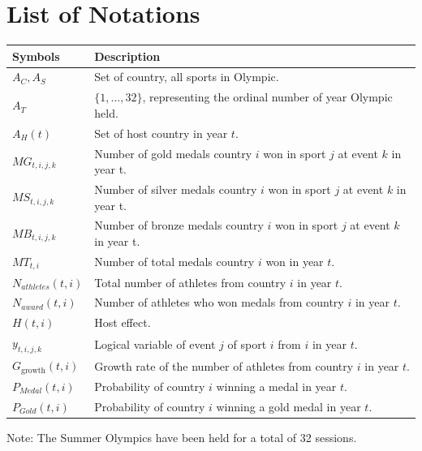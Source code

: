 \documentclass{mcmthesis}
\begin{document}
\section{List of Notations}
\begin{center}
\begin{tabular}{ll}
	\toprule
	{\bf Symbols} & {\bf Description}  \\
	\midrule 
	$A_{C},A_{S}$ & Set of country, all sports in Olympic.\\
	$A_{T}$ & $\{1,\dots,32\}$, representing the ordinal number of year Olympic held. \\
	$A_{H}(t)$ & Set of host country in year $t$. \\
	$MG_{t,i,j,k}$ & Number of gold medals country $i$ won in sport $j$ at event $k$ in year t. \\
	$MS_{t,i,j,k}$ & Number of silver medals country $i$ won in sport $j$ at event $k$ in year t. \\
	$MB_{t,i,j,k}$ & Number of bronze medals country $i$ won in sport $j$ at event $k$ in year t. \\
	$MT_{t,i}$ & Number of total medals country $i$ won in year $t$. \\
	$N_{athletes}(t,i)$ & Total number of athletes from country $i$ in year $t$. \\
	$N_{award}(t,i)$ & Number of athletes who won medals from country $i$ in year $t$. \\
	$H(t,i)$ & Host effect. \\
	$y_{t,i,j,k}$ &  Logical variable of event $j$ of sport $i$ from $i$ in year $t$. \\
	$G_{\text{growth}}(t,i)$ & Growth rate of the number of athletes from country $i$ in year $t$.\\
	$P_{Medal}(t,i)$ & Probability of country $i$ winning a medal in year $t$.\\
	$P_{Gold}(t,i)$ & Probability of country $i$ winning a gold medal in year $t$.\\
	\bottomrule
\end{tabular}
\end{center}

\noindent Note: The Summer Olympics have been held for a total of 32 sessions.












\end{document}
